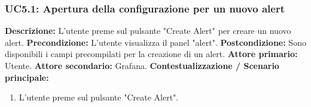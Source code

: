                 \subsubsection{UC5.1: Apertura della configurazione per un nuovo alert}
                    \textbf{Descrizione:} L’utente preme sul pulsante "Create Alert" per creare un nuovo alert.
                    \newline
                    \textbf{Precondizione:} L'utente visualizza il panel "alert".
                    \newline
                    \textbf{Postcondizione:} Sono disponibili i campi precompilati per la creazione di un alert.
                    \newline
                    \textbf{Attore primario:} Utente.
                    \newline
                    \textbf{Attore secondario:} Grafana.
                    \newline
                    \textbf{Contestualizzazione / Scenario principale:} \begin{enumerate}
                            \item L’utente preme sul pulsante "Create Alert".
                        \end{enumerate}  
                        
                        
                        
                    
